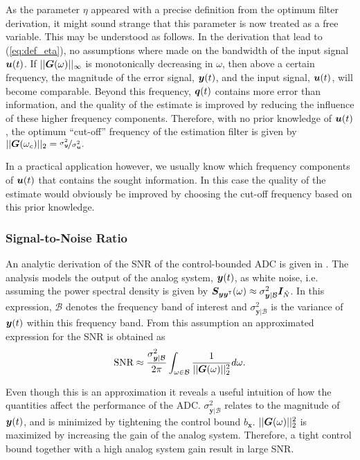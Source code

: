 As the parameter $\eta$ appeared with a precise definition from the optimum filter derivation, it might sound strange that this parameter is now treated as a free variable. This may be understood as follows. In the derivation that lead to (\ref{eq:def_eta}), no assumptions where made on the bandwidth of the input signal $\bm{u}(t)$. If $||\bm{G}(\omega)||_{\infty}$ is monotonically decreasing in $\omega$, then above a certain frequency, the magnitude of the error signal, $\bm{y}(t)$, and the input signal, $\bm{u}(t)$, will become comparable. Beyond this frequency, $\bm{q}(t)$ contains more error than information, and the quality of the estimate is improved by reducing the influence of these higher frequency components. Therefore, with no prior knowledge of $\bm{u}(t)$, the optimum \enquote{cut-off} frequency of the estimation filter is given by $||\bm{G}(\omega_c)||_2 =\nicefrac{\sigma_{\bm{y}}^2}{\sigma_{\bm{u}}^2}.$

In a practical application however, we usually know which frequency components of $\bm{u}(t)$ that contains the sought information. In this case the quality of the estimate would obviously be improved by choosing the cut-off frequency based on this prior knowledge.



\subsubsection*{Signal-to-Noise Ratio}
An analytic derivation of the SNR of the control-bounded ADC is given in \cite{cbc_2020_loeliger}. The analysis models the output of the analog system, $\bm{y}(t)$, as white noise, i.e. assuming the power spectral density is given by $\bm{S}_{\bm{y}\bm{y}^\mathsf{T}}(\omega) \approx \sigma_{\bm{y}|\mathcal{B}}^2\bm{I}_{\tilde{N}}$. In this expression, $\mathcal{B}$ denotes the frequency band of interest and $\sigma_{\bm{y}|\mathcal{B}}^2$ is the variance of $\bm{y}(t)$ within this frequency band. From this assumption an approximated expression for the SNR is obtained as
\begin{equation}
    \label{eq:analytic_snr_est}
    \text{SNR} \approx \frac{\sigma_{\bm{y}|\mathcal{B}}^2}{2 \pi} \int_{\omega \in \mathcal{B}} \frac{1}{||\bm{G}(\omega)||_{2}^2} d\omega.
\end{equation}

Even though this is an approximation it reveals a useful intuition of how the quantities affect the performance of the ADC. $\sigma_{\bm{y}|\mathcal{B}}^2$ relates to the magnitude of $\bm{y}(t)$, and is minimized by tightening the control bound $b_{\bm{x}}$. $||\bm{G}(\omega)||_{2}^2$ is maximized by increasing the gain of the analog system. Therefore, a tight control bound together with a high analog system gain result in large SNR.

